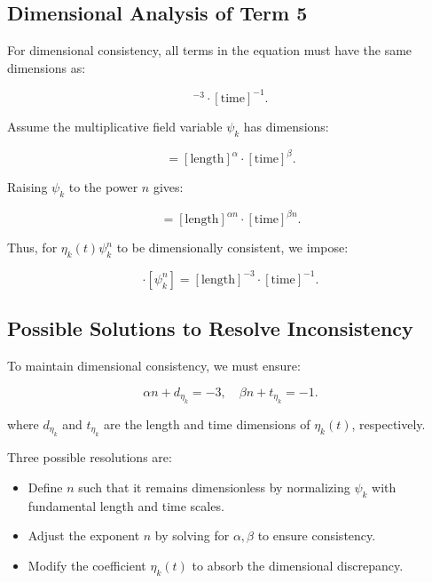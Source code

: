 \documentclass{article}
\theoremstyle{plain}
\begin{document}
\subsection{Dimensional Analysis of Term 5}

For dimensional consistency, all terms in the equation must have the same dimensions as:

\begin{equation}
[\text{length}]^{-3} \cdot [\text{time}]^{-1}.
\end{equation}

Assume the multiplicative field variable \(\psi_k\) has dimensions:

\begin{equation}
[\psi_k] = [\text{length}]^{\alpha} \cdot [\text{time}]^{\beta}.
\end{equation}

Raising \(\psi_k\) to the power \(n\) gives:

\begin{equation}
[\psi_k^n] = [\text{length}]^{\alpha n} \cdot [\text{time}]^{\beta n}.
\end{equation}

Thus, for \(\eta_k (t) \psi_k^n\) to be dimensionally consistent, we impose:

\begin{equation}
[\eta_k (t)] \cdot [\psi_k^n] = [\text{length}]^{-3} \cdot [\text{time}]^{-1}.
\end{equation}

\subsection{Possible Solutions to Resolve Inconsistency}
To maintain dimensional consistency, we must ensure:

\begin{equation}
\alpha n + d_{\eta_k} = -3, \quad \beta n + t_{\eta_k} = -1.
\end{equation}

where \( d_{\eta_k} \) and \( t_{\eta_k} \) are the length and time dimensions of \(\eta_k (t)\), respectively.

Three possible resolutions are:
\begin{itemize}
    \item Define \( n \) such that it remains dimensionless by normalizing \( \psi_k \) with fundamental length and time scales.
    \item Adjust the exponent \( n \) by solving for \( \alpha, \beta \) to ensure consistency.
    \item Modify the coefficient \( \eta_k (t) \) to absorb the dimensional discrepancy.
\end{itemize}
\end{document}
